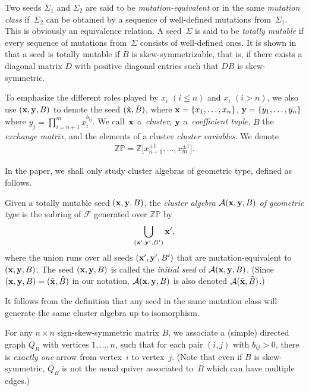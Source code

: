 \documentclass[11pt]{article}
\numberwithin{equation}{section}
\begin{document}
Two seeds $\Sigma_1$ and $\Sigma_2$ are said to be \emph{mutation-equivalent} or in the same \emph{mutation class} if~$\Sigma_2$ can be obtained by a sequence of well-def\/ined mutations from~$\Sigma_1$. This is obviously an equivalence relation. A seed~$\Sigma$ is said to be \emph{totally mutable}  if every sequence of mutations from~$\Sigma$ consists of well-def\/ined ones. It is shown in \cite[Proposition~4.5]{FZ1} that a seed is totally mutable if $B$ is skew-symmetrizable, that is, if there exists a diagonal matrix $D$ with positive diagonal entries such that $DB$ is skew-symmetric.


To emphasize the dif\/ferent roles played by $x_i$ $(i\le n)$ and $x_i$ $(i>n)$, we also use $({\bf x},{\bf y},B)$ to denote the seed $(\tilde{\bf x}, \tilde{B})$, where ${\bf x}=\{x_1,\dots,x_n\}$, ${\bf y}=\{y_1,\dots,y_n\}$ where $y_j=\prod\limits_{i=n+1}^mx_i^{b_{ij}}$. We call~${\bf x}$ a~\emph{cluster}, ${\bf y}$ a~\emph{coefficient tuple}, $B$ the \emph{exchange matrix}, and the elements of a cluster \emph{cluster variables}. We denote
\begin{gather*}
\mathbb{ZP}=\mathbb{Z}\big[x_{n+1}^{\pm1},\dots,x_m^{\pm1}\big].
\end{gather*}

In the paper, we shall only study cluster algebras of geometric type, def\/ined as follows.

\begin{Definition}
Given a totally mutable seed $({\bf x}, {\bf y},B)$, the \emph{cluster algebra} $\mathcal{A}({\bf x},{\bf y},B)$ \emph{of geometric type} is the subring of $\mathcal{F}$ generated over $\mathbb{ZP}$ by
\begin{gather*}
\bigcup_{({\bf x}',{\bf y}',B')} {\bf x}',
 \end{gather*}
 where the union runs over all seeds $({\bf x}', {\bf y}',B')$ that are mutation-equivalent to $({\bf x},{\bf y},B)$. The seed $({\bf x},{\bf y},B)$ is called the \emph{initial seed} of $\mathcal{A}({\bf x},{\bf y},B)$. (Since $({\bf x},{\bf y},B)=(\tilde{\bf x},\tilde{B})$ in our notation, $\mathcal{A}({\bf x},{\bf y},B)$ is also denoted $\mathcal{A}(\tilde{\bf x},\tilde{B})$.)
\end{Definition}

It follows from the def\/inition that any seed in the same mutation class will generate the same cluster algebra up to isomorphism.

 For any $n \times n$ sign-skew-symmetric matrix $B$, we associate a (simple) directed graph $Q_B$ with vertices $1,\ldots,n$, such that for each pair $(i,j)$ with $b_{ij}>0$, there is  \emph{exactly one} arrow from vertex~$i$ to vertex~$j$.
(Note that even if $B$ is skew-symmetric, $Q_B$ is not the usual quiver associated to~$B$ which can have multiple edges.)
\end{document}
